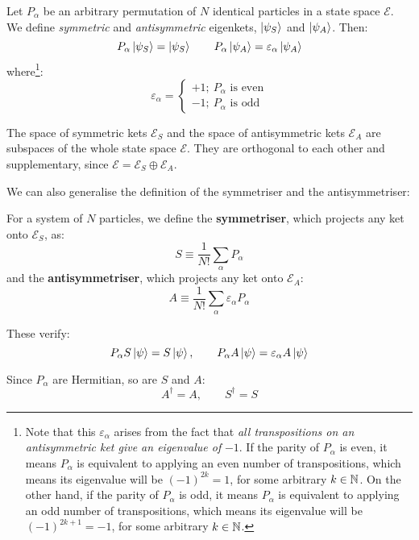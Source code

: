 \begin{definition}
    Let $P_\alpha$ be an arbitrary permutation of $N$ identical particles in a state space $\mathcal{E}$. We define \textit{symmetric} and \textit{antisymmetric} eigenkets, $\ket{\psi_S}$ and $\ket{\psi_A}$. Then:
    \begin{equation}
        P_\alpha\ket{\psi_S} = \ket{\psi_S}\qquad P_\alpha\ket{\psi_A} = \varepsilon_\alpha\ket{\psi_A}
    \end{equation}
    where\footnote{Note that this $\varepsilon_\alpha$ arises from the fact that \textit{all transpositions on an antisymmetric ket give an eigenvalue of} $-1$. If the parity of $P_\alpha$ is even, it means $P_\alpha$ is equivalent to applying an even number of transpositions, which means its eigenvalue will be $(-1)^{2k} = 1$, for some arbitrary $k\in\mathbb{N}$. On the other hand, if the parity of $P_\alpha$ is odd, it means $P_\alpha$ is equivalent to applying an odd number of transpositions, which means its eigenvalue will be $(-1)^{2k + 1} = -1$, for some arbitrary $k\in\mathbb{N}$.}:
    \begin{equation}
        \varepsilon_\alpha = \begin{cases}
            +1;\ P_\alpha\text{ is even}\\
            -1;\ P_\alpha\text{ is odd}
        \end{cases}
    \end{equation} 

    The space of symmetric kets $\mathcal{E}_S$ and the space of antisymmetric kets $\mathcal{E}_A$ are subspaces of the whole state space $\mathcal{E}$. They are orthogonal to each other and supplementary, since $\mathcal{E} = \mathcal{E}_S \oplus \mathcal{E}_A$.
\end{definition}
 
We can also generalise the definition of the symmetriser and the antisymmetriser:

\begin{definition}
    For a system of $N$ particles, we define the \textbf{symmetriser}, which projects any ket onto $\mathcal{E}_S$, as:
    \begin{equation}
        S \equiv \frac{1}{N!}\sum_{\alpha} P_\alpha
    \end{equation}
    and the \textbf{antisymmetriser}, which projects any ket onto $\mathcal{E}_A$:
    \begin{equation}
        A \equiv \frac{1}{N!}\sum_{\alpha} \varepsilon_\alpha P_\alpha
    \end{equation}

    These verify:
    \begin{equation}
        P_\alpha S\ket{\psi} = S\ket{\psi}, \qquad P_\alpha A\ket{\psi} = \varepsilon_\alpha A\ket{\psi}
    \end{equation}

    Since $P_\alpha$ are Hermitian, so are $S$ and $A$:
    \begin{equation}
        A^\dagger = A,\qquad S^\dagger = S
    \end{equation}
\end{definition}


